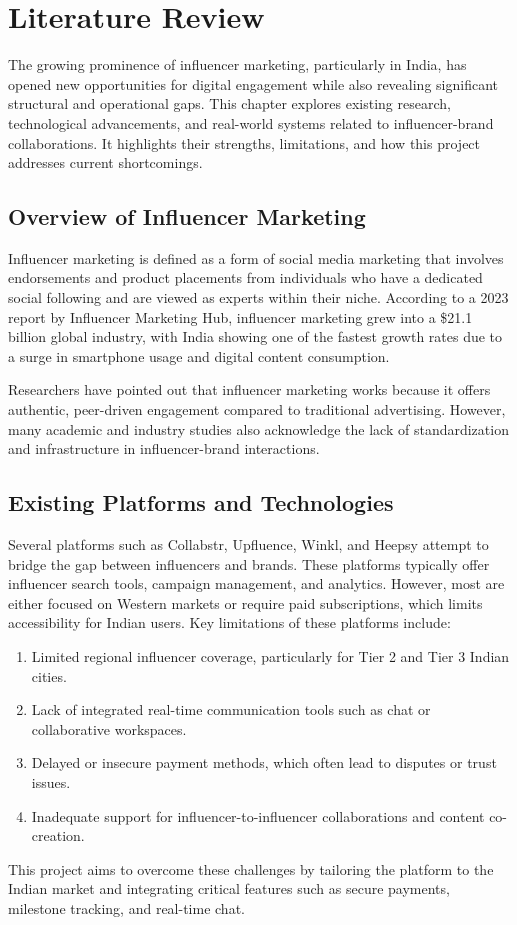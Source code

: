 \chapter{Literature Review}
\begin{justify}
    The growing prominence of influencer marketing, particularly in India, has opened new opportunities for digital engagement while also revealing significant structural and operational gaps. This chapter explores existing research, technological advancements, and real-world systems related to influencer-brand collaborations. It highlights their strengths, limitations, and how this project addresses current shortcomings.

    \section{Overview of Influencer Marketing}
    Influencer marketing is defined as a form of social media marketing that involves endorsements and product placements from individuals who have a dedicated social following and are viewed as experts within their niche. According to a 2023 report by Influencer Marketing Hub, influencer marketing grew into a \$21.1 billion global industry, with India showing one of the fastest growth rates due to a surge in smartphone usage and digital content consumption.
    \par
    Researchers have pointed out that influencer marketing works because it offers authentic, peer-driven engagement compared to traditional advertising. However, many academic and industry studies also acknowledge the lack of standardization and infrastructure in influencer-brand interactions.
    \section{Existing Platforms and Technologies}
    Several platforms such as Collabstr, Upfluence, Winkl, and Heepsy attempt to bridge the gap between influencers and brands. These platforms typically offer influencer search tools, campaign management, and analytics. However, most are either focused on Western markets or require paid subscriptions, which limits accessibility for Indian users.
Key limitations of these platforms include:
\begin{enumerate}
    \item 	Limited regional influencer coverage, particularly for Tier 2 and Tier 3 Indian cities.
    \item 	Lack of integrated real-time communication tools such as chat or collaborative workspaces.
    \item 	Delayed or insecure payment methods, which often lead to disputes or trust issues.
    \item 	Inadequate support for influencer-to-influencer collaborations and content co-creation.
\end{enumerate}
This project aims to overcome these challenges by tailoring the platform to the Indian market and integrating critical features such as secure payments, milestone tracking, and real-time chat.


\end{justify}
